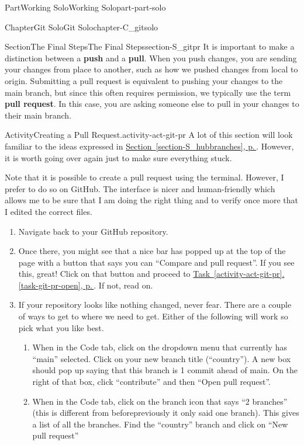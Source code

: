 \documentclass[twoside,10pt,]{book}
\newcommand{\xreffont}{\relax}
\newcommand{\terminology}[1]{\textbf{#1}}
\begin{document}
\begin{partptx}{Part}{Working Solo}{}{Working Solo}{}{}{part-part-solo}
\begin{chapterptx}{Chapter}{Git Solo}{}{Git Solo}{}{}{chapter-C_gitsolo}
\begin{sectionptx}{Section}{The Final Steps}{}{The Final Steps}{}{}{section-S_gitpr}
It is important to make a distinction between a \terminology{push} and a \terminology{pull}. When you push changes, you are sending your changes from place to another, such as how we pushed changes from local to origin. Submitting a pull request is equivalent to pushing your changes to the main branch, but since this often requires permission, we typically use the term \terminology{pull request}. In this case, you are asking someone else to pull in your changes to their main branch.%
\begin{activity}{Activity}{Creating a Pull Request.}{activity-act-git-pr}%
%
A lot of this section will look familiar to the ideas expressed in \hyperref[section-S_hubbranches]{Section~{\xreffont\ref{section-S_hubbranches}}, p.\,\pageref{section-S_hubbranches}}. However, it is worth going over again just to make sure everything stuck.%
\par
Note that it is possible to create a pull request using the terminal. However, I prefer to do so on GitHub. The interface is nicer and human-friendly which allows me to be sure that I am doing the right thing and to verify once more that I edited the correct files.%
\begin{enumerate}[font=\bfseries,label=(\alph*),ref=\alph*]%
\item{}Navigate back to your GitHub repository.%
\item{}Once there, you might see that a nice bar has popped up at the top of the page with a button that says you can ``Compare and pull request''. If you see this, great! Click on that button and proceed to \hyperref[task-git-pr-open]{Task~{\xreffont\ref{activity-act-git-pr}}.{\xreffont\ref{task-git-pr-open}}, p.\,\pageref{task-git-pr-open}}. If not, read on.%
\item\label{task-git-pr-create}If your repository looks like nothing changed, never fear. There are a couple of ways to get to where we need to get. Either of the following will work so pick what you like best.%
\begin{enumerate}
\item{}When in the Code tab, click on the dropdown menu that currently has ``main'' selected. Click on your new branch title (``country''). A new box should pop up saying that this branch is 1 commit ahead of main. On the right of that box, click ``contribute'' and then ``Open pull request''.%
\item{}When in the Code tab, click on the branch icon that says ``2 branches'' (this is different from before\textellipsis{}previously it only said one branch). This gives a list of all the branches. Find the ``country'' branch and click on ``New pull request''%

\end{enumerate}
\end{enumerate}
\end{activity}
\end{sectionptx}
\end{chapterptx}
\end{partptx}
\end{document}
